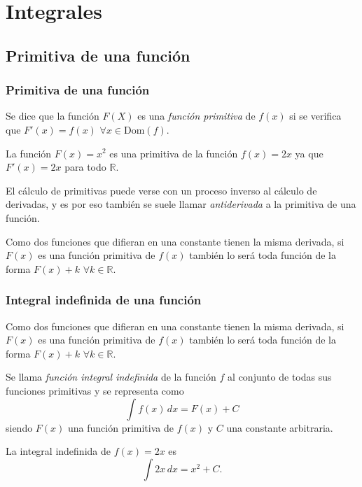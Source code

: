 \section{Integrales}


\subsection{Primitiva de una función}
\begin{frame}
	\frametitle{Primitiva de una función}
	\begin{definicion}
		Se dice que la función $F(X)$ es una \emph{función primitiva} de $f(x)$ si se verifica que $F'(x)=f(x)$ $\forall x \in \textrm{Dom}(f)$.
	\end{definicion}
	 La función $F(x)=x^2$ es una primitiva de la función $f(x)=2x$ ya que $F'(x)=2x$ para todo $\mathbb{R}$.
	
	El cálculo de primitivas puede verse con un proceso inverso al cálculo de derivadas, y es por eso también se suele llamar \emph{antiderivada} a la primitiva de una función.
	
	Como dos funciones que difieran en una constante tienen la misma derivada, si $F(x)$ es una función primitiva de $f(x)$
	también lo será toda función de la forma $F(x)+k$ $\forall k \in \mathbb{R}$. 
\end{frame}


\begin{frame}
	\frametitle{Integral indefinida de una función}
	Como dos funciones que difieran en una constante tienen la misma derivada, si $F(x)$ es una función primitiva de $f(x)$ también lo será toda función de la forma $F(x)+k$ $\forall k \in \mathbb{R}$.
	
	\begin{definicion}
		Se llama \emph{función integral indefinida} de la función $f$ al conjunto de todas sus funciones primitivas y se representa como
		\[
			\int{f(x)}\,dx=F(x)+C
		\]
		siendo $F(x)$ una función primitiva de $f(x)$ y $C$ una constante arbitraria.
	\end{definicion}
	
	 La integral indefinida de $f(x)=2x$ es
	\[\int 2x\, dx = x^2+C.\]
\end{frame}


